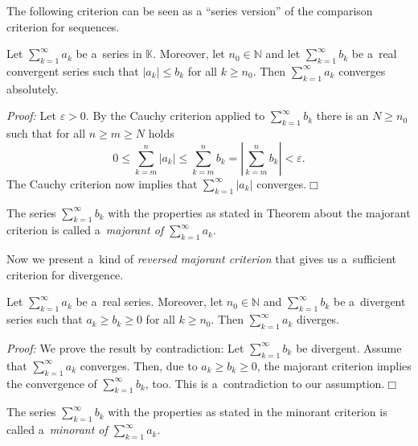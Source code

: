 

The following criterion can be seen as a ``series version'' of the comparison criterion for sequences.  
\begin{Theorem}
\label{thm:majcrit}
Let $\sum_{k=1}^\infty a_k$ be a~series in $\mathbb{K}$. Moreover, let $n_0\in \mathbb{N}$ and let $\sum_{k=1}^\infty b_k$ 
be a~real convergent series such that $|a_k|\leq b_k$ for all $k\geq n_0$. Then $\sum_{k=1}^\infty a_k$ converges absolutely.
\end{Theorem}
{\em Proof:} Let $\varepsilon>0$. By the Cauchy criterion applied to $\sum_{k=1}^\infty b_k$ there is an $N\geq n_0$ such that for all $n\geq m\geq N$ holds
\[0\leq \sum_{k=m}^n|a_k|\leq\sum_{k=m}^nb_k=\left|\sum_{k=m}^nb_k\right|<\varepsilon.\]
The Cauchy criterion now implies that $\sum_{k=1}^\infty |a_k|$ converges.\hfill$\Box$
%
%
\begin{Remark}{}
 The series $\sum_{k=1}^\infty b_k$ with the properties as stated in Theorem about the majorant criterion is called a~{\em majorant of $\sum_{k=1}^\infty a_k$}.
\end{Remark}
%
%
Now we present a~kind of {\em reversed majorant criterion} that gives us a~sufficient criterion for divergence.
\begin{Theorem}\label{thm:mincrit}
Let $\sum_{k=1}^\infty a_k$ be a~real series. Moreover, let $n_0\in \mathbb{N}$ and $\sum_{k=1}^\infty b_k$ 
be a~divergent series such that $a_k\geq b_k\geq 0$ for all $k\geq n_0$. Then $\sum_{k=1}^\infty a_k$ diverges.
\end{Theorem}
{\em Proof:} We prove the result by contradiction: Let $\sum_{k=1}^\infty b_k$ be divergent. 
Assume that $\sum_{k=1}^\infty a_k$ converges. Then, due to $a_k\geq b_k\geq 0$, the majorant criterion implies the convergence of 
$\sum_{k=1}^\infty b_k$, too. This is a~contradiction to our assumption.\hfill$\Box$

\begin{Remark}{}
 The series $\sum_{k=1}^\infty b_k$ with the properties as stated in the minorant criterion is called a~{\em minorant of $\sum_{k=1}^\infty a_k$}.
\end{Remark}
%
